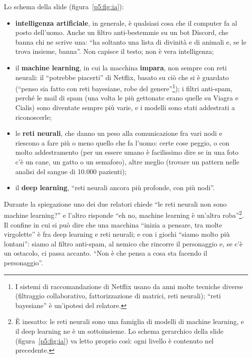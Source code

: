 Lo schema della slide (figura~\ref{p5:fig:ia}):
\begin{itemize}
  \item \textbf{intelligenza artificiale}, in generale, è qualsiasi cosa che il
        computer fa al posto dell'uomo. Anche un filtro anti-bestemmie su un bot
        Discord, che banna chi ne scrive una: ``ha soltanto una lista di
        divinità e di animali e, se le trova insieme, banna''. Non capisce il
        testo; non è vera intelligenza;
  \item il \textbf{machine learning}, in cui la macchina \textbf{impara}, non
        sempre con reti neurali: il ``potrebbe piacerti'' di Netflix, basato su
        ciò che si è guardato (``penso sia fatto con reti bayesiane, robe del
        genere''\footnote{I sistemi di raccomandazione di Netflix usano da anni
        molte tecniche diverse (filtraggio collaborativo, fattorizzazione di
        matrici, reti neurali); ``reti bayesiane'' è un'ipotesi del relatore.});
        i filtri anti-spam, perché le mail di spam (una volta le più gettonate
        erano quelle su Viagra e Cialis) sono diventate sempre più varie, e i
        modelli sono stati addestrati a riconoscerle;
  \item le \textbf{reti neurali}, che danno un peso alla comunicazione fra vari
        nodi e riescono a fare più o meno quello che fa l'uomo: certe cose
        peggio, o con molto addestramento (per un essere umano è facilissimo
        dire se in una foto c'è un cane, un gatto o un semaforo), altre meglio
        (trovare un pattern nelle analisi del sangue di 10.000 pazienti);
  \item il \textbf{deep learning}, ``reti neurali ancora più profonde, con più
        nodi''.
\end{itemize}
Durante la spiegazione uno dei due relatori chiede ``le reti neurali non sono
machine learning?'' e l'altro risponde ``eh no, machine learning è un'altra
roba''\footnote{È inesatto: le reti neurali sono una famiglia di modelli di
machine learning, e il deep learning ne è un sottoinsieme. Lo schema
gerarchico della slide (figura~\ref{p5:fig:ia}) va letto proprio così: ogni
livello è contenuto nel precedente.}. Il confine in cui si può dire che una
macchina ``inizia a pensare, tra molte virgolette'' è fra deep learning e reti
neurali; e con i giochi ``siamo molto più lontani'': siamo al filtro anti-spam,
al nemico che rincorre il personaggio e, se c'è un ostacolo, ci passa accanto.
``Non è che pensa a cosa sta facendo il personaggio''.

